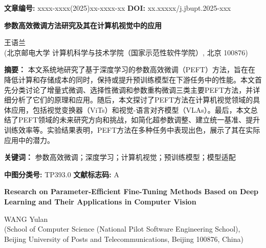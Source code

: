 \documentclass[12pt,a4paper,twoside]{article} %
\begin{document}
\thispagestyle{firstpage}

\noindent
\textbf{文章编号:} xxxx-xxxx(2025)xx-xxxx-xx \hspace{1cm} \textbf{DOI:} xx.xxxxx/j.jbupt.2025-xxx \\[0.8em]

\begin{center}
    {\LARGE \textbf{参数高效微调方法研究及其在计算机视觉中的应用}}
\end{center}

\begin{center}
    {\large 王语兰}\\[0.1em]
    {\footnotesize
    (北京邮电大学 计算机科学与技术学院（国家示范性软件学院）, 北京 100876)
    }
\end{center}

\noindent
\textbf{摘要：} 本文系统地研究了基于深度学习的参数高效微调（PEFT）方法，旨在在降低计算和存储成本的同时，保持或提升预训练模型在下游任务中的性能。本文首先分类讨论了增量式微调、选择性微调和参数重构微调三类主要PEFT方法，并详细分析了它们的原理和应用。随后，本文探讨了PEFT方法在计算机视觉领域的具体应用，包括视觉变换器（ViTs）和视觉-语言对齐模型（VLAs）。最后，本文总结了PEFT领域的未来研究方向和挑战，如简化超参数调整、建立统一基准、提升训练效率等。实验结果表明，PEFT方法在多种任务中表现出色，展示了其在实际应用中的潜力。

\noindent
\textbf{关\hspace{0.5em}键\hspace{0.5em}词：} 参数高效微调；深度学习；计算机视觉；预训练模型；模型适配

\noindent
\textbf{中图分类号:} TP393.0 \hspace{3em} \textbf{文献标志码:} A

\begin{center}
    {\Large \textbf{Research on Parameter-Efficient Fine-Tuning Methods Based on Deep Learning and Their Applications in Computer Vision}}
\end{center}

\begin{center}
    {\large WANG Yulan}\\[0.1em]
    {\footnotesize
    (School of Computer Science (National Pilot Software Engineering School), Beijing University of Posts and Telecommunications, Beijing 100876, China)
    }
\end{center}
\end{document}
